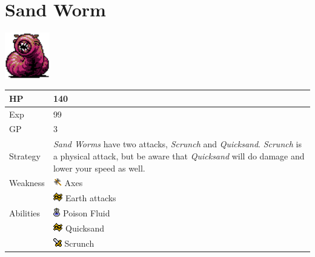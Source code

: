 \section{Sand Worm}
\label{monster:sand_worm}

\includegraphics[height=2cm,keepaspectratio]{./resources/monster/sand_worm}

\begin{longtable}{ l p{9cm} }
	HP
	& 140
\\ \hline
	Exp
	& 99
\\ \hline
	GP
	& 3
\\ \hline
	Strategy
	& \textit{Sand Worms} have two attacks, \textit{Scrunch} and \textit{Quicksand}. \textit{Scrunch} is a physical attack, but be aware that \textit{Quicksand} will do damage and lower your speed as well.
\\ \hline
	Weakness
	& \includegraphics[height=1em,keepaspectratio]{./resources/effects/axe} Axes \\
	& \includegraphics[height=1em,keepaspectratio]{./resources/effects/earth} Earth attacks
\\ \hline
	Abilities
	& \includegraphics[height=1em,keepaspectratio]{./resources/effects/poison} Poison Fluid \\
	& \includegraphics[height=1em,keepaspectratio]{./resources/effects/earth} Quicksand \\
	& \includegraphics[height=1em,keepaspectratio]{./resources/effects/damage} Scrunch
\end{longtable}
